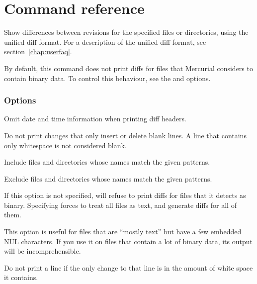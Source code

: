 \chapter{Command reference}
\label{cmdref}



Show differences between revisions for the specified files or
directories, using the unified diff format.  For a description of the
unified diff format, see section~\ref{chap:userfaq}.

By default, this command does not print diffs for files that Mercurial
considers to contain binary data.  To control this behaviour, see the
 and  options.

\subsection{Options}


Omit date and time information when printing diff headers.


Do not print changes that only insert or delete blank lines.  A line
that contains only whitespace is not considered blank.


Include files and directories whose names match the given patterns.


Exclude files and directories whose names match the given patterns.


If this option is not specified,  will refuse to print
diffs for files that it detects as binary. Specifying 
forces  to treat all files as text, and generate diffs for
all of them.

This option is useful for files that are ``mostly text'' but have a
few embedded NUL characters.  If you use it on files that contain a
lot of binary data, its output will be incomprehensible.


Do not print a line if the only change to that line is in the amount
of white space it contains.

